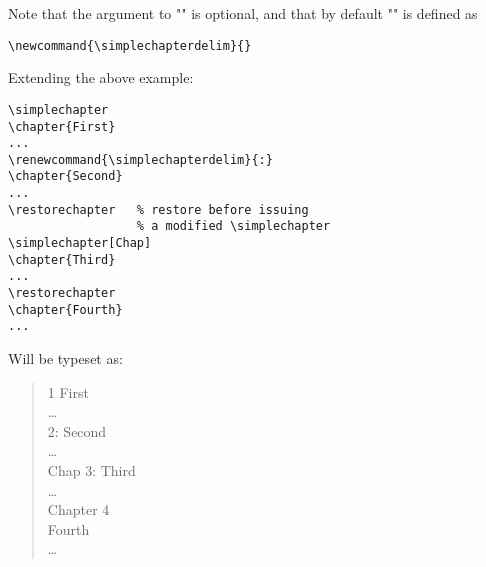 \documentclass[DIV=8, pagesize=auto]{scrartcl}
\begin{document}
Note that the argument to "\simplechapter" is optional, and that by default
"\simplechapterdelim" is defined as
%
\begin{verbatim}
\newcommand{\simplechapterdelim}{}
\end{verbatim}

\begin{samepage}
Extending the above example:
%
\begin{verbatim}
\simplechapter
\chapter{First}
...
\renewcommand{\simplechapterdelim}{:}
\chapter{Second}
...
\restorechapter   % restore before issuing
                  % a modified \simplechapter
\simplechapter[Chap]
\chapter{Third}
...
\restorechapter
\chapter{Fourth}
...
\end{verbatim}
%
Will be typeset as:
%
\begin{quote}
  1 First\\
  \ldots\\
  2: Second\\
  \ldots\\
  Chap 3: Third\\
  \ldots\\
  Chapter 4\\
  Fourth\\
  \ldots
\end{quote}
\end{samepage}
\end{document}
